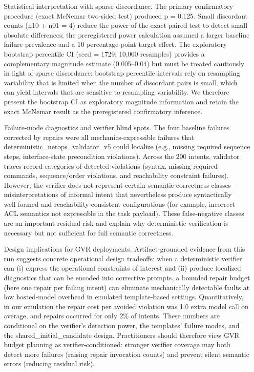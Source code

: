 \documentclass[conference]{IEEEtran}
\begin{document}
Statistical interpretation with sparse discordance. The primary confirmatory procedure (exact McNemar two‑sided test) produced p = 0.125. Small discordant counts (n10 + n01 = 4) reduce the power of the exact paired test to detect small absolute differences; the preregistered power calculation assumed a larger baseline failure prevalence and a 10 percentage‑point target effect. The exploratory bootstrap percentile CI (seed = 1729; 10,000 resamples) provides a complementary magnitude estimate (0.005--0.04) but must be treated cautiously in light of sparse discordance: bootstrap percentile intervals rely on resampling variability that is limited when the number of discordant pairs is small, which can yield intervals that are sensitive to resampling variability. We therefore present the bootstrap CI as exploratory magnitude information and retain the exact McNemar result as the preregistered confirmatory inference.

Failure‑mode diagnostics and verifier blind spots. The four baseline failures corrected by repairs were all mechanics‑expressible failures that deterministic\_netops\_validator\_v5 could localize (e.g., missing required sequence steps, interface‑state precondition violations). Across the 200 intents, validator traces record categories of detected violations (syntax, missing required commands, sequence/order violations, and reachability constraint failures). However, the verifier does not represent certain semantic correctness classes---misinterpretations of informal intent that nevertheless produce syntactically well‑formed and reachability‑consistent configurations (for example, incorrect ACL semantics not expressible in the task payload). These false‑negative classes are an important residual risk and explain why deterministic verification is necessary but not sufficient for full semantic correctness.

Design implications for GVR deployments. Artifact‑grounded evidence from this run suggests concrete operational design tradeoffs: when a deterministic verifier can (i) express the operational constraints of interest and (ii) produce localized diagnostics that can be encoded into corrective prompts, a bounded repair budget (here one repair per failing intent) can eliminate mechanically detectable faults at low hosted‑model overhead in emulated template‑based settings. Quantitatively, in our emulation the repair cost per avoided violation was 1.0 extra model call on average, and repairs occurred for only 2\% of intents. These numbers are conditional on the verifier's detection power, the templates' failure modes, and the shared\_initial\_candidate design. Practitioners should therefore view GVR budget planning as verifier‑conditioned: stronger verifier coverage may both detect more failures (raising repair invocation counts) and prevent silent semantic errors (reducing residual risk).
\end{document}
